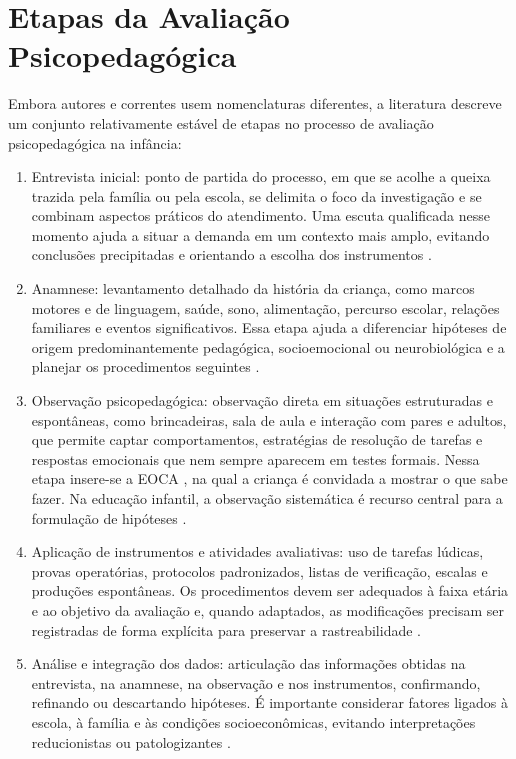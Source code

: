\section{Etapas da Avaliação Psicopedagógica}

Embora autores e correntes usem nomenclaturas diferentes, a literatura descreve um conjunto relativamente estável de etapas no processo de avaliação psicopedagógica na infância:

\begin{enumerate}
    \item Entrevista inicial: ponto de partida do processo, em que se acolhe a queixa trazida pela família ou pela escola, se delimita o foco da investigação e se combinam aspectos práticos do atendimento. Uma escuta qualificada nesse momento ajuda a situar a demanda em um contexto mais amplo, evitando conclusões precipitadas e orientando a escolha dos instrumentos \cite{Franca_Oliveira_Oliveira_Ribeiro_Dias_Victoria_2024}.
    \item Anamnese: levantamento detalhado da história da criança, como marcos motores e de linguagem, saúde, sono, alimentação, percurso escolar, relações familiares e eventos significativos. Essa etapa ajuda a diferenciar hipóteses de origem predominantemente pedagógica, socioemocional ou neurobiológica e a planejar os procedimentos seguintes \cite{Transtorno_do_Espectro_Autista}.
    \item Observação psicopedagógica: observação direta em situações estruturadas e espontâneas, como brincadeiras, sala de aula e interação com pares e adultos, que permite captar comportamentos, estratégias de resolução de tarefas e respostas emocionais que nem sempre aparecem em testes formais. Nessa etapa insere-se a EOCA \cite{visca1987_clinica_psicopedagogica}, na qual a criança é convidada a mostrar o que sabe fazer. Na educação infantil, a observação sistemática é recurso central para a formulação de hipóteses \cite{Costa_2024}.
    \item Aplicação de instrumentos e atividades avaliativas: uso de tarefas lúdicas, provas operatórias, protocolos padronizados, listas de verificação, escalas e produções espontâneas. Os procedimentos devem ser adequados à faixa etária e ao objetivo da avaliação e, quando adaptados, as modificações precisam ser registradas de forma explícita para preservar a rastreabilidade \cite{tavares2022_instrumentos_psicopedagogicos}.
    \item Análise e integração dos dados: articulação das informações obtidas na entrevista, na anamnese, na observação e nos instrumentos, confirmando, refinando ou descartando hipóteses. É importante considerar fatores ligados à escola, à família e às condições socioeconômicas, evitando interpretações reducionistas ou patologizantes \cite{Batista_Souza_Rosa_Nakano_Lima_2025}.

\end{enumerate}
